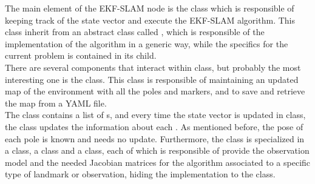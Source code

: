 The main element of the EKF-SLAM node is the  class which is responsible of keeping track of the state vector and execute the EKF-SLAM algorithm. This class inherit from an abstract class called , which is responsible of the implementation of the algorithm in a generic way, while the specifics for the current problem is contained in its child.\\

There are several components that interact within  class, but probably the most interesting one is the  class. This class is responsible of maintaining an updated map of the environment with all the poles and markers, and to save and retrieve the map from a YAML file.\\

The  class contains a list of s, and every time the state vector is updated in  class, the  class updates the information about each . As mentioned before, the pose of each pole is known and needs no update. Furthermore, the  class is specialized in a  class, a  class and a  class, each of which is responsible of provide the observation model and the needed Jacobian matrices for the algorithm associated to a specific type of landmark or observation, hiding the implementation to the  class.
